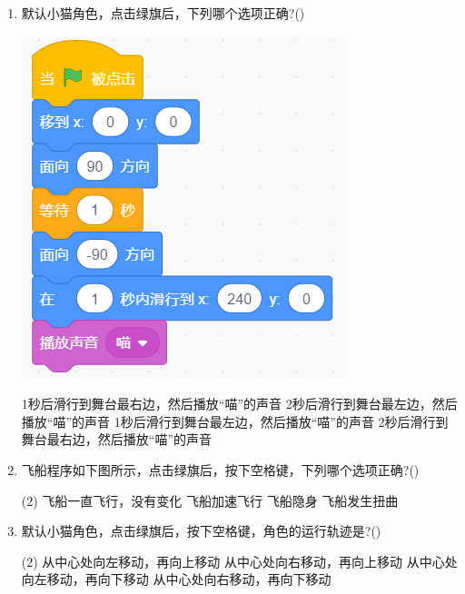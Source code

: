 \documentclass[10pt, a4paper]{article}
\begin{document}
\begin{enumerate}
        \item 默认小猫角色，点击绿旗后，下列哪个选项正确?(\qquad)
        
        \begin{minipage}{.3\textwidth}
            \centering
            \includegraphics[width=.7\textwidth]{5.png}
        \end{minipage}
        \begin{minipage}{.64\textwidth}
            \begin{tasks}
                \task 1秒后滑行到舞台最右边，然后播放“喵”的声音
                \task 2秒后滑行到舞台最左边，然后播放“喵”的声音
                \task 1秒后滑行到舞台最左边，然后播放“喵”的声音
                \task 2秒后滑行到舞台最右边，然后播放“喵”的声音
            \end{tasks}
        \end{minipage}

        \newpage
        \item 飞船程序如下图所示，点击绿旗后，按下空格键，下列哪个选项正确?(\qquad)
        \begin{tasks}(2)
            \task 飞船一直飞行，没有变化
            \task 飞船加速飞行
            \task 飞船隐身
            \task 飞船发生扭曲
        \end{tasks}

        \item 默认小猫角色，点击绿旗后，按下空格键，角色的运行轨迹是?(\qquad)
        \begin{tasks}(2)
            \task 从中心处向左移动，再向上移动
            \task 从中心处向右移动，再向上移动
            \task 从中心处向左移动，再向下移动
            \task 从中心处向右移动，再向下移动
        \end{tasks}


\end{enumerate}
\end{document}
